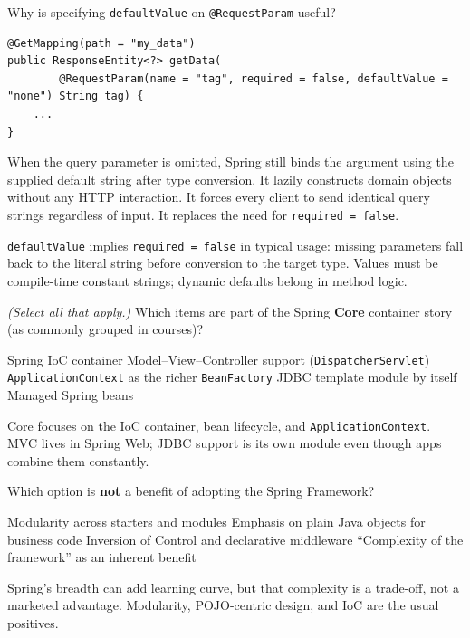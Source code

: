 \question[4]
Why is specifying \texttt{defaultValue} on \texttt{@RequestParam} useful?
\begin{lstlisting}[style=java]
@GetMapping(path = "my_data")
public ResponseEntity<?> getData(
        @RequestParam(name = "tag", required = false, defaultValue = "none") String tag) {
    ...
}
\end{lstlisting}
\begin{choices}
  \CorrectChoice When the query parameter is omitted, Spring still binds the argument using the supplied default string after type conversion.
  \choice It lazily constructs domain objects without any HTTP interaction.
  \choice It forces every client to send identical query strings regardless of input.
  \choice It replaces the need for \texttt{required = false}.
\end{choices}
\begin{solution}
  \texttt{defaultValue} implies \texttt{required = false} in typical usage: missing parameters fall back to the literal string before conversion to the target type. Values must be compile-time constant strings; dynamic defaults belong in method logic.
\end{solution}

\question[4]
\textit{(Select all that apply.)} Which items are part of the Spring \textbf{Core} container story (as commonly grouped in courses)?
\begin{checkboxes}
  \CorrectChoice Spring IoC container
  \choice Model--View--Controller support (\texttt{DispatcherServlet})
  \CorrectChoice \texttt{ApplicationContext} as the richer \texttt{BeanFactory}
  \choice JDBC template module by itself
  \CorrectChoice Managed Spring beans
\end{checkboxes}
\begin{solution}
  Core focuses on the IoC container, bean lifecycle, and \texttt{ApplicationContext}. MVC lives in Spring Web; JDBC support is its own module even though apps combine them constantly.
\end{solution}

\question[4]
Which option is \textbf{not} a benefit of adopting the Spring Framework?
\begin{choices}
  \choice Modularity across starters and modules
  \choice Emphasis on plain Java objects for business code
  \choice Inversion of Control and declarative middleware
  \CorrectChoice ``Complexity of the framework'' as an inherent benefit
\end{choices}
\begin{solution}
  Spring's breadth can add learning curve, but that complexity is a trade-off, not a marketed advantage. Modularity, POJO-centric design, and IoC are the usual positives.
\end{solution}

